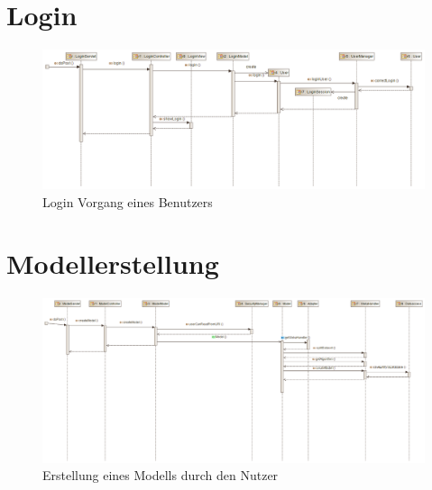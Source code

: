 \section{Login}


\begin{figure}[h]
\centering
\includegraphics[width=1.0\linewidth]{Grafik/Sequenzdiagramme/Login.png}
 \caption{Login Vorgang eines Benutzers}
\end{figure}

\section{Modellerstellung}

\begin{figure}[h]
\centering
\includegraphics[width=1.0\linewidth]{Grafik/Sequenzdiagramme/Modelerstellung.png}
 \caption{Erstellung eines Modells durch den Nutzer}
\end{figure}